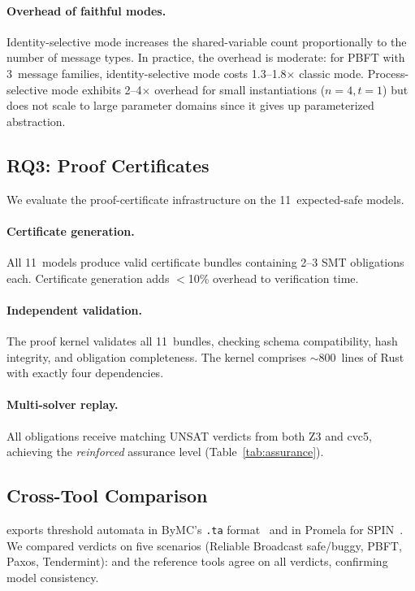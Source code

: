 \paragraph{Overhead of faithful modes.}
Identity-selective mode increases the shared-variable count
proportionally to the number of message types.  In practice, the
overhead is moderate: for PBFT with 3~message families,
identity-selective mode costs 1.3--1.8$\times$ classic mode.
Process-selective mode exhibits 2--4$\times$ overhead for small
instantiations ($n{=}4, t{=}1$) but does not scale to large parameter
domains since it gives up parameterized abstraction.

\subsection{RQ3: Proof Certificates}

We evaluate the proof-certificate infrastructure on the 11~expected-safe
models.

\paragraph{Certificate generation.}
All 11~models produce valid certificate bundles containing 2--3 SMT
obligations each.  Certificate generation adds $<$10\% overhead to
verification time.

\paragraph{Independent validation.}
The proof kernel validates all 11~bundles, checking schema
compatibility, hash integrity, and obligation completeness.  The
kernel comprises ${\sim}$800~lines of Rust with exactly four
dependencies.

\paragraph{Multi-solver replay.}
All obligations receive matching UNSAT verdicts from both Z3 and cvc5,
achieving the \emph{reinforced} assurance level
(Table~\ref{tab:assurance}).

\subsection{Cross-Tool Comparison}

\tarsier{} exports threshold automata in ByMC's \texttt{.ta}
format~\cite{KonnovWidder2018} and in Promela for
SPIN~\cite{Holzmann2003}.  We compared verdicts on five scenarios
(Reliable Broadcast safe/buggy, PBFT, Paxos, Tendermint):
\tarsier{} and the reference tools agree on all verdicts, confirming
model consistency.

